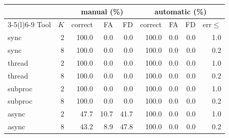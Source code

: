 \begin{tabular*}{\columnwidth}{@{\extracolsep{\fill}}lrrrrrrrr@{}}
\toprule
 & & \multicolumn{3}{c}{manual (\%)} & \multicolumn{4}{c}{automatic (\%)} \\
\cmidrule(lr){3-5}\cmidrule(l){6-9}
Tool & $K$ & correct & FA & FD & correct & FA & FD & err$\le$ \\
\midrule
sync & 2 & 100.0 & 0.0 & 0.0 & 100.0 & 0.0 & 0.0 & 1.0 \\
sync & 8 & 100.0 & 0.0 & 0.0 & 100.0 & 0.0 & 0.0 & 0.2 \\
thread & 2 & 100.0 & 0.0 & 0.0 & 100.0 & 0.0 & 0.0 & 1.0 \\
thread & 8 & 100.0 & 0.0 & 0.0 & 100.0 & 0.0 & 0.0 & 0.2 \\
subproc & 2 & 100.0 & 0.0 & 0.0 & 100.0 & 0.0 & 0.0 & 1.0 \\
subproc & 8 & 100.0 & 0.0 & 0.0 & 100.0 & 0.0 & 0.0 & 0.2 \\
async & 2 & 47.7 & 10.7 & 41.7 & 100.0 & 0.0 & 0.0 & 1.0 \\
async & 8 & 43.2 & 8.9 & 47.8 & 100.0 & 0.0 & 0.0 & 0.2 \\
\bottomrule
\end{tabular*}
